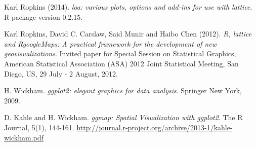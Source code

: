 \documentclass[a4paper,11pt,twoside,openright]{book}							%
\begin{document}
\begin{thebibliography}{99}
Karl Ropkins (2014). \emph{loa: various plots, options and add-ins for use with lattice}. R package version 0.2.15.

Karl Ropkins, David C. Carslaw, Said Munir and Haibo Chen (2012). \emph{R, lattice and RgoogleMaps: A practical framework for the development of new geovisualizations}. Invited paper for Special Session on Statistical Graphics, American Statistical Association (ASA) 2012 Joint Statistical Meeting, San Diego, US, 29 July - 2 August, 2012.

H. Wickham. \emph{ggplot2: elegant graphics for data analysis}. Springer New York, 2009.

D. Kahle and H. Wickham. \emph{ggmap: Spatial Visualization with ggplot2}. The R Journal, 5(1), 144-161. \href{http://journal.r-project.org/archive/2013-1/kahle-wickham.pdf}{http://journal.r-project.org/archive/2013-1/kahle-wickham.pdf}

\end{thebibliography}
\end{document}
